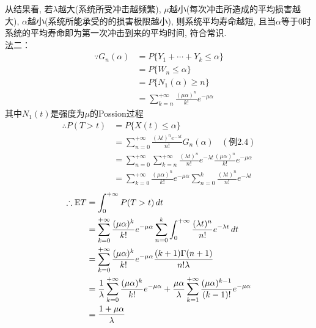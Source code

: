 从结果看, 若$\lambda$越大(系统所受冲击越频繁), $\mu$越小(每次冲击所造成的平均损害越大), $\alpha$越小(系统所能承受的的损害极限越小), 则系统平均寿命越短, 且当$\alpha$等于$0$时系统的平均寿命即为第一次冲击到来的平均时间, 符合常识.\\
法二：
\[
\begin{split}
\because G_n(\alpha) & = P\{Y_1+\cdots+Y_k \leqslant \alpha\}\\
					& = P\{W_n \leqslant \alpha\}\\
					& = P\{N_1(\alpha) \geqslant n\}\\
					& = \sum^{+\infty}_{k=n}\frac{(\mu\alpha)^n}{k!}e^{-\mu\alpha}
\end{split}
\]
其中$N_1(t)$是强度为$\mu$的Possion过程\\
\[
\begin{split}
\therefore P(T>t) & = P\{X(t) \leqslant \alpha\}\\
			& = \sum^{+\infty}_{n=0}\frac{(\lambda t)^ne^{-\lambda t}}{n!}G_n(\alpha)~~~~(\text{例}2.4)\\
			& = \sum^{+\infty}_{n=0}\sum^{+\infty}_{k=n}\frac{(\lambda t)^n}{n!}e^{-\lambda t}\frac{(\mu\alpha)^n}{k!}e^{-\mu\alpha}\\
			& = \sum^{+\infty}_{k=0}\frac{(\mu\alpha)^n}{k!}e^{-\mu\alpha}\sum^{k}_{n=0}\frac{(\lambda t)^n}{n!}e^{-\lambda t}
\end{split}
\]
\[
\begin{split}
\therefore \mathrm{E} T & =  \int^{+\infty}_0P(T>t)\,dt\\
				& = \sum^{+\infty}_{k=0}\frac{(\mu\alpha)^k}{k!}e^{-\mu\alpha}\sum^{k}_{n=0}\int^{+\infty}_0\frac{(\lambda t)^n}{n!}e^{-\lambda t}\,dt\\
				& = \sum^{+\infty}_{k=0}\frac{(\mu\alpha)^k}{k!}e^{-\mu\alpha}\frac{(k+1)\Gamma(n+1)}{n!\lambda}\\
				& = \frac{1}{\lambda}\sum^{+\infty}_{k=0}\frac{(\mu\alpha)^k}{k!}e^{-\mu\alpha} + \frac{\mu\alpha}{\lambda}\sum^{+\infty}_{k=1}\frac{(\mu\alpha)^{k-1}}{(k-1)!}e^{-\mu\alpha}\\
				& = \frac{1+\mu\alpha}{\lambda}
\end{split}
\]



